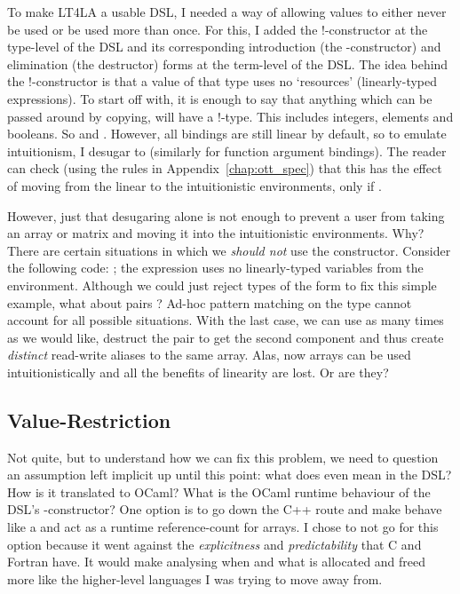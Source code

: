 To make LT4LA a usable DSL, I needed a way of allowing values to either never
be used or be used more than once. For this, I added the \mbox{!-constructor}
at the type-level of the DSL and its corresponding introduction (the
-constructor) and elimination (the  destructor) forms at the term-level of the DSL.  The idea behind the
\mbox{!-constructor} is that a value of that type uses no `resources'
(linearly-typed expressions). To start off with, it is enough to say that
anything which can be passed around by copying, will have a \mbox{!-type}. This
includes integers, elements and booleans. So  and . However, all bindings are still linear by default, so to emulate
intuitionism, I desugar  to  (similarly for function argument
bindings). The reader can check (using the rules in
Appendix~\ref{chap:ott_spec}) that this has the effect of moving 
from the linear to the intuitionistic environments, only if .

However, just that desugaring alone is not enough to prevent a user from taking
an array or matrix and moving it into the intuitionistic environments. Why?
There are certain situations in which we \emph{should not} use the 
constructor.  Consider the following code: ; the expression  uses no linearly-typed variables
from the environment. Although we could just reject types of the form
 to fix this simple example, what about pairs ?  Ad-hoc pattern matching on the type cannot
account for all possible situations. With the last case, we can use 
as many times as we would like, destruct the pair to get the second component
and thus create \emph{distinct} read-write aliases to the same array.  Alas,
now arrays can be used intuitionistically and all the benefits of linearity are
lost.  Or are they?

\subsection{Value-Restriction}

Not quite, but to understand how we can fix this problem, we need to question
an assumption left implicit up until this point: what does  even
mean in the DSL? How is it translated to OCaml? What is the OCaml runtime
behaviour of the DSL's -constructor? One option is to go down the
C++ route and make  behave like a  and act as a
runtime reference-count for arrays. I chose to not go for this option because
it went against the \emph{explicitness} and \emph{predictability} that C and
Fortran have. It would make analysing when and what is allocated and freed more
like the higher-level languages I was trying to move away from.

